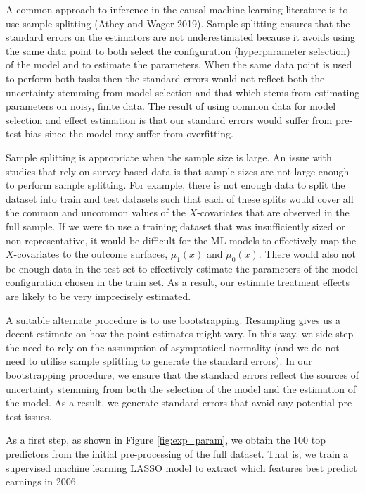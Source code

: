 \documentclass[12pt, a4paper]{article}
\begin{document}
A common approach to inference in the causal machine learning literature is to use sample splitting (Athey and Wager 2019). Sample splitting ensures that the standard errors on the estimators are not underestimated because it avoids using the same data point to both select the configuration (hyperparameter selection) of the model and to estimate the parameters. When the same data point is used to perform both tasks then the standard errors would not reflect both the uncertainty stemming from model selection and that which stems from estimating parameters on noisy, finite data. The result of using common data for model selection and effect estimation is that our standard errors would suffer from pre-test bias since the model may suffer from overfitting.

Sample splitting is appropriate when the sample size is large. An issue with studies that rely on survey-based data is that sample sizes are not large enough to perform sample splitting. For example, there is not enough data to split the dataset into train and test datasets such that each of these splits would cover all the common and uncommon values of the $X$-covariates that are observed in the full sample. If we were to use a training dataset that was insufficiently sized or non-representative, it would be difficult for the ML models to effectively map the $X$-covariates to the outcome surfaces, $\mu_1(x)$ and $\mu_0(x)$. There would also not be enough data in the test set to effectively estimate the parameters of the model configuration chosen in the train set. As a result, our estimate treatment effects are likely to be very imprecisely estimated. 

A suitable alternate procedure is to use bootstrapping. Resampling gives us a decent estimate on how the point estimates might vary. In this way, we side-step the need to rely on the assumption of asymptotical normality (and we do not need to utilise sample splitting to generate the standard errors). In our bootstrapping procedure, we ensure that the standard errors reflect the sources of uncertainty stemming from both the selection of the model and the estimation of the model. As a result, we generate standard errors that avoid any potential pre-test issues.

As a first step, as shown in Figure \ref{fig:exp_param}, we obtain the 100 top predictors from the initial pre-processing of the full dataset. That is, we train a supervised machine learning LASSO model to extract which features best predict earnings in 2006.
\end{document}
